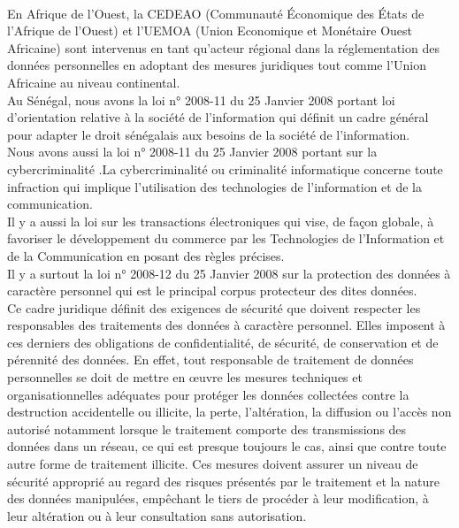 \\En Afrique de l’Ouest, la CEDEAO (Communauté Économique des États de l'Afrique de l'Ouest) et l’UEMOA (Union Economique et Monétaire Ouest Africaine)   sont intervenus en tant qu’acteur régional dans la réglementation des données personnelles en adoptant des mesures juridiques tout comme l’Union Africaine au niveau continental. \\
Au Sénégal, nous avons la loi n° 2008-11 du 25 Janvier 2008 portant loi d’orientation relative à la société de l’information qui  définit un cadre général pour adapter le droit sénégalais aux besoins de la société de l’information. \\
Nous avons aussi la loi n° 2008-11 du 25 Janvier 2008 portant sur la cybercriminalité .La cybercriminalité ou criminalité informatique concerne toute infraction qui implique l’utilisation des technologies de l'information et de la communication. \\
Il y a aussi la loi sur les transactions électroniques qui vise, de façon globale, à favoriser le développement du commerce par les Technologies de l’Information et de la Communication en posant des règles précises. \\
Il y a surtout la loi n° 2008-12 du 25 Janvier 2008 sur la protection des données à caractère personnel qui est le principal corpus protecteur des dites données.\\
Ce cadre juridique définit des exigences de sécurité que doivent respecter les responsables des traitements des données à caractère personnel. Elles imposent à ces derniers des obligations de confidentialité, de sécurité, de conservation et de pérennité des données. En effet, tout responsable de traitement de données personnelles se doit de mettre en œuvre les mesures techniques et organisationnelles adéquates pour protéger les données collectées contre la destruction accidentelle ou illicite, la perte, l’altération, la diffusion ou l’accès non autorisé notamment lorsque le traitement comporte des transmissions des données dans un réseau, ce qui est presque toujours le cas, ainsi que contre toute autre forme de traitement illicite. Ces mesures doivent assurer un niveau de sécurité approprié au regard des risques présentés par le traitement et la nature des données manipulées, empêchant le tiers de procéder à leur modification, à leur altération ou à leur consultation sans autorisation.\\

